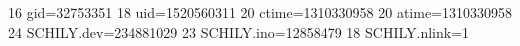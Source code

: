 16 gid=32753351
18 uid=1520560311
20 ctime=1310330958
20 atime=1310330958
24 SCHILY.dev=234881029
23 SCHILY.ino=12858479
18 SCHILY.nlink=1
